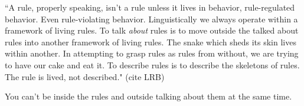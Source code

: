``A rule, properly speaking, isn't a rule unless it lives in behavior,
rule-regulated behavior. Even rule-violating behavior. Linguistically we always
operate within a framework of living rules. To talk \emph{about} rules is to
move outside the talked about rules into another framework of living rules. The
snake which sheds its skin lives within another. In attempting to grasp rules as
rules from without, we are trying to have our cake and eat it. To describe rules
is to describe the skeletons of rules. The rule is lived, not described."
(cite LRB)

You can't be inside the rules and outside talking about them at the same time.
